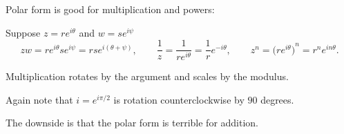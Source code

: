 \documentclass[10pt,aspectratio=169]{beamer}
\begin{document}
\begin{frame}

Polar form is good for multiplication and powers:

\pause
\medskip

Suppose $z = r e^{i\theta}$ and $w = s e^{i \psi}$
\pause
\begin{equation*}
zw =
r e^{i \theta} s e^{i \psi} = 
rs e^{i (\theta+ \psi)},
\qquad
\frac{1}{z} =
\frac{1}{r e^{i \theta}} =
\frac{1}{r} e^{-i \theta} ,
\qquad
z^n =
{\bigl(r e^{i \theta}\bigr)}^n =
r^n e^{i n\theta} .
\end{equation*}

\medskip
\pause

Multiplication rotates by the argument and scales by the modulus.

\pause
\medskip

Again note that $i = e^{i \pi / 2}$ is
rotation counterclockwise by $90$ degrees.

\pause
\medskip

The downside is that the polar form is terrible for addition.

\end{frame}
\end{document}
